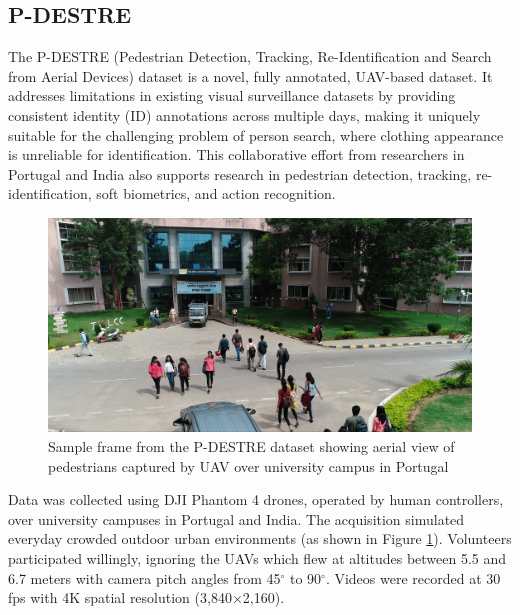 \subsection{P-DESTRE}

The P-DESTRE (Pedestrian Detection, Tracking, Re-Identification and Search from Aerial Devices) dataset \cite{kumar2020pdestrefullyannotateddataset} is a novel, fully annotated, UAV-based dataset. It addresses limitations in existing visual surveillance datasets by providing consistent identity (ID) annotations across multiple days, making it uniquely suitable for the challenging problem of person search, where clothing appearance is unreliable for identification. This collaborative effort from researchers in Portugal and India also supports research in pedestrian detection, tracking, re-identification, soft biometrics, and action recognition.

\begin{figure}[htbp]
    \centering
    \includegraphics[width=1\textwidth]{Figure/pdestre.png}
    \caption{Sample frame from the P-DESTRE dataset showing aerial view of pedestrians captured by UAV over university campus in Portugal}
    \label{fig:pdestre_overview}
\end{figure}

Data was collected using DJI Phantom 4 drones, operated by human controllers, over university campuses in Portugal and India. The acquisition simulated everyday crowded outdoor urban environments (as shown in Figure \ref{fig:pdestre_overview}). Volunteers participated willingly, ignoring the UAVs which flew at altitudes between 5.5 and 6.7 meters with camera pitch angles from 45$^\circ$ to 90$^\circ$. Videos were recorded at 30 fps with 4K spatial resolution (3,840$\times$2,160).


